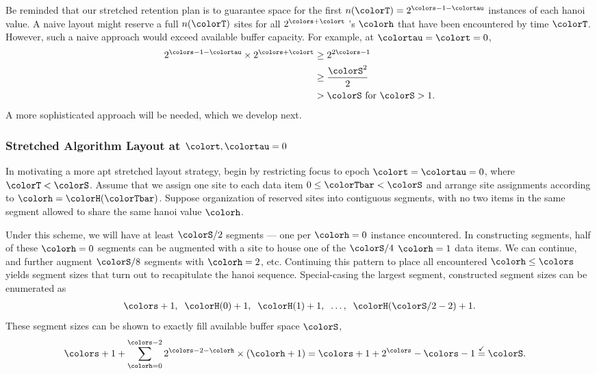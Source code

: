 

Be reminded that our stretched retention plan is to guarantee space for the first $n(\colorT) =  2^{\colors - 1 - \colortau}$ instances of each hanoi value.
A naive layout might reserve a full $n(\colorT)$ sites for all $2^{\colors + \colort}$ \hv{}'s $\colorh$ that have been encountered by time $\colorT$.
However, such a naive approach would exceed available buffer capacity.
For example, at $\colortau=\colort=0$,
\begin{align*}
2^{\colors - 1 - \colortau} \times 2^{\colors + \colort}
&\geq
2^{2\colors - 1}\\
&\geq
\frac{\colorS^{2}}{2}\\
&> \colorS \text{ for } \colorS > 1.
\end{align*}
A more sophisticated approach will be needed, which we develop next.

\subsubsection{Stretched Algorithm Layout at $\colort,\colortau=0$}

In motivating a more apt stretched layout strategy, begin by restricting focus to epoch $\colort=\colortau=0$, where $\colorT < \colorS$.
Assume that we assign one site to each data item $0\leq \colorTbar < \colorS$ and arrange site assignments according to \hv{} $\colorh = \colorH(\colorTbar)$.
Suppose organization of reserved sites into contiguous segments, with no two items in the same segment allowed to share the same hanoi value $\colorh$.

Under this scheme, we will have at least $\colorS/2$ segments --- one per \hv{} $\colorh=0$ instance encountered.
In constructing segments, half of these $\colorh=0$ segments can be augmented with a site to house one of the $\colorS/4$ \hv{} $\colorh=1$ data items.
We can continue, and further augment $\colorS/8$ segments with \hv{} $\colorh=2$, etc.
Continuing this pattern to place all encountered \hv{} $\colorh\leq\colors$ yields segment sizes that turn out to recapitulate the hanoi sequence.
Special-casing the largest segment, constructed segment sizes can be enumerated as
\begin{align}
\colors + 1,\;\; \colorH(0) + 1,\;\; \colorH(1) + 1,\;\; \ldots,\;\; \colorH(\colorS/2 - 2) + 1.
\label{eqn:stretched-segment-sizes}
\end{align}
These segment sizes can be shown to exactly fill available buffer space $\colorS$,
\begin{align*}
\colors + 1
+  \sum_{\colorh = 0}^{\colors - 2}
2^{\colors - 2 - \colorh} \times (\colorh + 1)
&=
\colors + 1 +
2^{\colors} - \colors - 1
\stackrel{\checkmark}{=}
\colorS.
\end{align*}

